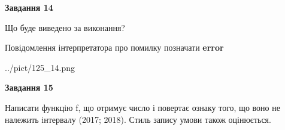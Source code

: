 \documentclass[11pt, ukrainian]{article}
\begin{document}
{\begin {large}
{\begin {center}\textbf{Завдання 14}\end {center}}\par
Що буде виведено за виконання? \par
Повідомлення інтерпретатора про помилку позначати \textbf{error}

\begin{center}
	{../pict/125_14.png}
\end{center}
\newpage

{\begin {center}\textbf{Завдання 15}\end {center}}\par

Написати функцiю f, що отримує число і повертає ознаку того, що воно не належить iнтервалу (2017; 2018). Стиль запису умови також оцінюється.\par
\newpage

\end {large}}
\end{document}
